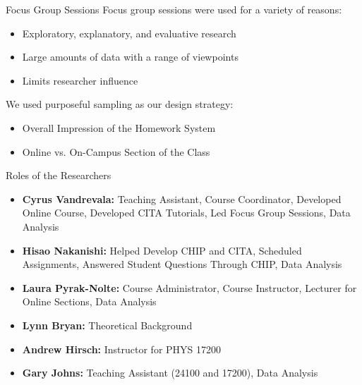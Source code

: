\documentclass[xcolor=x11names,compress]{beamer}
\begin{document}
\begin{frame}{Focus Group Sessions}
	Focus group sessions were used for a variety of reasons:
	\vspace{1mm}
	\begin{itemize}
		\item Exploratory, explanatory, and evaluative research
		\item Large amounts of data with a range of viewpoints
		\item Limits researcher influence
	\end{itemize}
	\vspace{5mm}
	We used purposeful sampling as our design strategy:
	\vspace{1mm}
	\begin{itemize}
		\item Overall Impression of the Homework System
		\item Online vs. On-Campus Section of the Class
	\end{itemize}
\end{frame}

\begin{frame}{Roles of the Researchers}
	\begin{itemize}
		\item \textbf{Cyrus Vandrevala:} Teaching Assistant, Course Coordinator, Developed Online Course, Developed CITA Tutorials, Led Focus Group Sessions, Data Analysis
		\vspace{2mm}
		\item \textbf{Hisao Nakanishi:} Helped Develop CHIP and CITA, Scheduled Assignments, Answered Student Questions Through CHIP, Data Analysis
		\vspace{2mm}
		\item \textbf{Laura Pyrak-Nolte:} Course Administrator, Course Instructor, Lecturer for Online Sections, Data Analysis
		\vspace{2mm}
		\item \textbf{Lynn Bryan:} Theoretical Background
		\vspace{2mm}
		\item \textbf{Andrew Hirsch:} Instructor for PHYS 17200
		\vspace{2mm}
		\item \textbf{Gary Johns:} Teaching Assistant (24100 and 17200), Data Analysis
	\end{itemize}
\end{frame}

\end{document}
